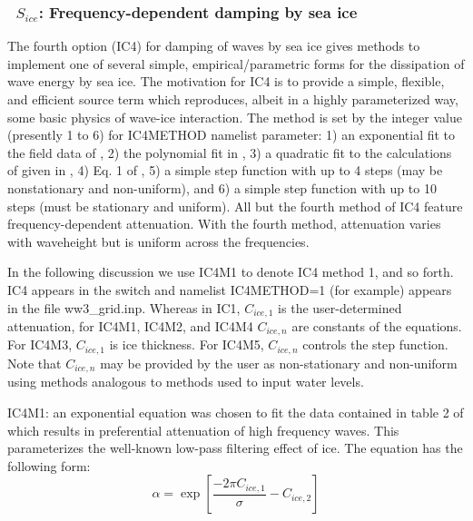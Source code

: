 \vsssub
\subsubsection{~$S_{ice}$: Frequency-dependent damping by sea ice} \label{sec:ICE4}
\vsssub


\noindent
The fourth option ({\code IC4}) for damping of waves by sea ice gives methods to implement one of several simple, empirical/parametric forms for the dissipation of wave energy by sea ice.  The motivation for {\code IC4} is to provide a simple, flexible, and efficient source term which reproduces, albeit in a highly parameterized way, some basic physics of wave-ice interaction. The method is set by the integer value (presently 1 to 6) for {\code IC4METHOD} namelist parameter: 1) an exponential fit to the field data of \cite{art:WAD88}, 2) the polynomial fit in \cite{art:MBK14}, 3) a quadratic fit to the calculations of \cite{art:KM08} given in \cite{art:HT15}, 4) Eq. 1 of \cite{art:Ko14}, 5) a simple step function with up to 4 steps (may be nonstationary and non-uniform), and 6) a simple step function with up to 10 steps (must be stationary and uniform). All but the fourth method of {\code IC4} feature frequency-dependent attenuation. With the fourth method, attenuation varies with waveheight but is uniform across the frequencies. 

In the following discussion we use {\code IC4M1} to denote {\code IC4} method 1, and so forth. {\code IC4} appears in the {\file switch} and namelist {\code IC4METHOD=1} (for example) appears in the file {\file ww3\_grid.inp}. Whereas in {\code IC1}, ${C_{ice,1}}$ is the user-determined attenuation, for {\code IC4M1}, {\code IC4M2}, and {\code IC4M4} ${C_{ice,n}}$ are constants of the equations. For {\code IC4M3}, ${C_{ice,1}}$ is ice thickness. For {\code IC4M5}, ${C_{ice,n}}$ controls the step function. Note that ${C_{ice,n}}$ may be provided by the user as non-stationary and non-uniform using methods analogous to methods used to input water levels.

{\code IC4M1}: an exponential equation was chosen to fit the data contained in table 2 of \cite{art:WAD88} which results in preferential attenuation of high frequency waves. This parameterizes the well-known low-pass filtering effect of ice. The equation has the following form:
\begin{equation}\label{eq:ice1}
  {\alpha} = \exp\left[\frac{-{2\pi}C_{ice, 1}}{{\sigma}} - C_{ice, 2}\right]
\end{equation}


